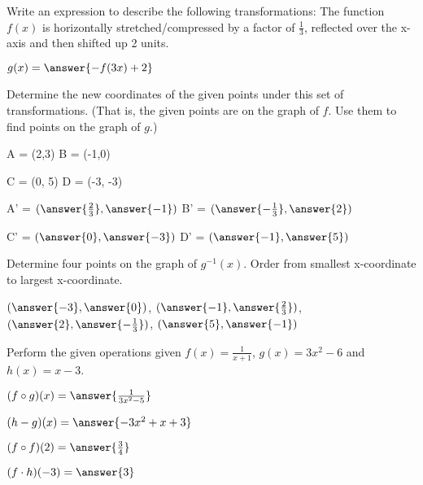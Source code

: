 \documentclass{ximera}
\begin{document}
\begin{problem}
    Write an expression to describe the following transformations:  The function $f(x)$ is horizontally stretched/compressed by a factor of $\frac{1}{3}$, reflected over the x-axis and then shifted up 2 units.

    $g(x) = \answer{-f(3x) + 2}$

    \begin{problem}
        Determine the new coordinates of the given points under this set of transformations. (That is, the given points are on the graph of $f$.  Use them to find points on the graph of $g$.)

         A = (2,3) \hspace{1in} B = (-1,0)

         C = (0, 5) \hspace{1in} D = (-3, -3)

        A' = $(\answer{\frac{2}{3}}, \answer{-1})$ \hspace{1in} B' = $(\answer{-\frac{1}{3}}, \answer{2})$

        C' = $(\answer{0}, \answer{-3})$ \hspace{1in} D' = $(\answer{-1}, \answer{5})$

        \begin{problem}
            Determine four points on the graph of $g^{-1}(x)$.  Order from smallest x-coordinate to largest x-coordinate.

            $(\answer{-3}, \answer{0})$, $(\answer{-1}, \answer{\frac{2}{3}})$, $(\answer{2}, \answer{-\frac{1}{3}})$, $(\answer{5}, \answer{-1})$
        \end{problem}
    \end{problem}
\end{problem}

\begin{problem}
    Perform the given operations given $f(x) = \frac{1}{x+1}$, $g(x) = 3x^2 -6$ and $h(x) = x-3$.

    $(f\circ g)(x) = \answer{\frac{1}{3x^2-5}}$

    $(h-g)(x) = \answer{-3x^2+x+3} $

    $(f\circ f)(2) = \answer{\frac{3}{4}}$

    $(f\cdot h)(-3) = \answer{3}$
\end{problem}
\end{document}
